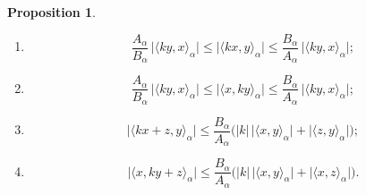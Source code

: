 \documentclass[preprint,12pt]{elsarticle}
\theoremstyle{definition}
\newtheorem{proposition}{Proposition}[section]
\begin{document}
\begin{proposition}
\begin{enumerate}
			\item 
			\[
			\frac{A_\alpha}{B_\alpha} \, \big|\langle k y, x \rangle_\alpha \big|
			\leq 
			\big|\langle k x, y \rangle_\alpha \big|
			\leq 
			\frac{B_\alpha}{A_\alpha} \, \big|\langle k y, x \rangle_\alpha \big|;
			\]
			
			\item 
			\[
			\frac{A_\alpha}{B_\alpha} \, \big|\langle k y, x \rangle_\alpha \big|
			\leq 
			\big|\langle x,  k y \rangle_\alpha \big|
			\leq 
			\frac{B_\alpha}{A_\alpha} \, \big|\langle k y, x \rangle_\alpha \big|;
			\]
			
			\item 
			\[
			\big|\langle k x + z, y \rangle_\alpha \big|
			\leq 
			\frac{B_\alpha}{A_\alpha} \Big( |k| \, \big|\langle x, y \rangle_\alpha \big| + \big|\langle z, y \rangle_\alpha \big| \Big);
			\]
			
			\item 
			\[
			\big|\langle x, k y + z \rangle_\alpha \big|
			\leq 
			\frac{B_\alpha}{A_\alpha} \Big( |k| \, \big|\langle x, y \rangle_\alpha \big| + \big|\langle x, z \rangle_\alpha \big| \Big).
			\]
		\end{enumerate}
		
\end{proposition}
\end{document}
